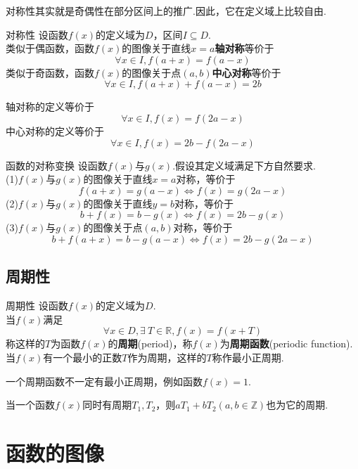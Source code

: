 \documentclass[lang=cn, zihao=5]{elegantbook}
\begin{document}
对称性其实就是奇偶性在部分区间上的推广.因此，它在定义域上比较自由.

\begin{definition}{对称性} %
    设函数$f(x)$的定义域为$D$，区间$I \subseteq D$.\\
    类似于偶函数，函数$f(x)$的图像关于直线$x=a$\textbf{轴对称}等价于
    $$ \forall x \in I, f(a+x)=f(a-x) $$
    类似于奇函数，函数$f(x)$的图像关于点$(a,b)$\textbf{中心对称}等价于
    $$ \forall x \in I, f(a+x)+f(a-x)=2b $$
\end{definition}
\begin{remark}
    轴对称的定义等价于$$\forall x \in I, f(x)=f(2a-x)$$
    中心对称的定义等价于$$\forall x \in I, f(x)=2b-f(2a-x)$$
\end{remark}

\begin{proposition}{函数的对称变换}
    设函数$f(x)$与$g(x)$.假设其定义域满足下方自然要求.\\
    (1)$f(x)$与$g(x)$的图像关于直线$x=a$对称，等价于$$f(a+x)=g(a-x) \Longleftrightarrow f(x)=g(2a-x)$$
    (2)$f(x)$与$g(x)$的图像关于直线$y=b$对称，等价于$$b+f(x)=b-g(x) \Longleftrightarrow f(x)=2b-g(x)$$
    (3)$f(x)$与$g(x)$的图像关于点$(a,b)$对称，等价于$$b+f(a+x)=b-g(a-x) \Longleftrightarrow f(x)=2b-g(2a-x)$$
\end{proposition}

\subsection{周期性}

\begin{definition}{周期性} %
    设函数$f(x)$的定义域为$D$.\\
    当$f(x)$满足$$\forall x \in D, \exists \ T \in \mathbb{R}, f(x)=f(x+T)$$
    称这样的$T$为函数$f(x)$的\textbf{周期}(period)，称$f(x)$为\textbf{周期函数}(periodic function).当$f(x)$有一个最小的正数$T$作为周期，这样的$T$称作最小正周期.
\end{definition}

\begin{remark}
    一个周期函数不一定有最小正周期，例如函数$f(x)=1$.
\end{remark}
\begin{remark}
    当一个函数$f(x)$同时有周期$T_1,T_2$，则$aT_1+bT_2(a,b \in \mathbb{Z})$也为它的周期.
\end{remark}

\section{函数的图像}
\end{document}
